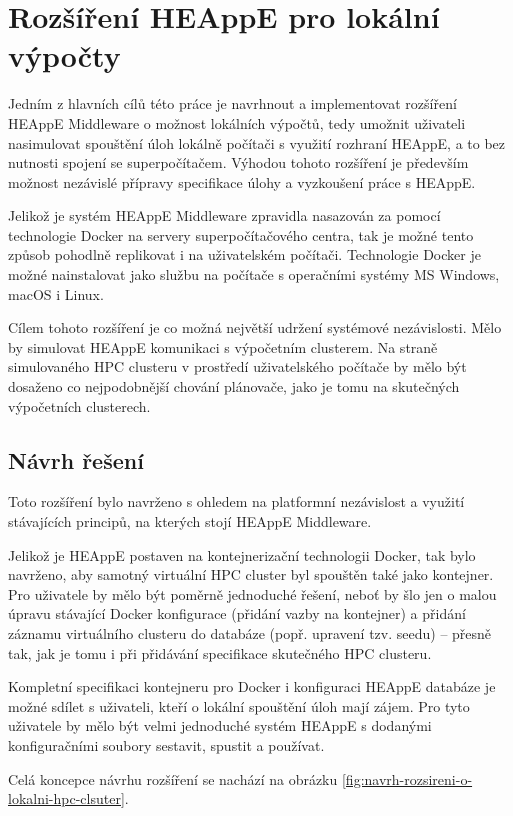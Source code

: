 \chapter{Rozšíření HEAppE pro lokální výpočty}
Jedním z hlavních cílů této práce je navrhnout a implementovat rozšíření HEAppE Middleware o možnost lokálních výpočtů, tedy umožnit uživateli nasimulovat spouštění úloh lokálně počítači s využití rozhraní HEAppE, a to bez nutnosti spojení se superpočítačem. Výhodou tohoto rozšíření je především možnost nezávislé přípravy specifikace úlohy a vyzkoušení práce s HEAppE.

Jelikož je systém HEAppE Middleware zpravidla nasazován za pomocí technologie Docker na servery superpočítačového centra, tak je možné tento způsob pohodlně replikovat i na uživatelském počítači. Technologie Docker je možné nainstalovat jako službu na počítače s operačními systémy MS Windows, macOS i Linux.

Cílem tohoto rozšíření je co možná největší udržení systémové nezávislosti. Mělo by simulovat HEAppE komunikaci s výpočetním clusterem. Na straně simulovaného HPC clusteru v prostředí uživatelského počítače by mělo být dosaženo co nejpodobnější chování plánovače, jako je tomu na skutečných výpočetních clusterech.

\section{Návrh řešení}
Toto rozšíření bylo navrženo s ohledem na platformní nezávislost a využití stávajících principů, na kterých stojí HEAppE Middleware.

Jelikož je HEAppE postaven na kontejnerizační technologii Docker, tak bylo navrženo, aby samotný virtuální HPC cluster byl spouštěn také jako kontejner. Pro uživatele by mělo být poměrně jednoduché řešení, neboť by šlo jen o malou úpravu stávající Docker konfigurace (přidání vazby na kontejner) a přidání záznamu virtuálního clusteru do databáze (popř. upravení tzv. seedu) – přesně tak, jak je tomu i při přidávání specifikace skutečného HPC clusteru.

Kompletní specifikaci kontejneru pro Docker i konfiguraci HEAppE databáze je možné sdílet s uživateli, kteří o lokální spouštění úloh mají zájem. Pro tyto uživatele by mělo být velmi jednoduché systém HEAppE s dodanými konfiguračními soubory sestavit, spustit a používat. 

Celá koncepce návrhu rozšíření se nachází na obrázku \ref{fig:navrh-rozsireni-o-lokalni-hpc-clsuter}.

